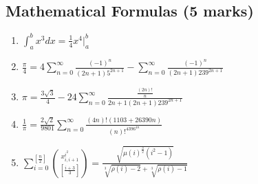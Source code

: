 \documentclass[a4paper,12pt]{article}
\begin{document}
\subsection {\textbf{Mathematical Formulas (5 marks)}}
%
\begin{enumerate}%
\item $ \int_a ^b x^3 dx = \frac{1}{4}x^4\Big\rvert_a ^b $
\item $ \frac{\pi}{4} =  4\sum\limits_{n=0}^{\infty} \frac{(-1)^n}{(2n+1)5^{2n+1}}  -  \sum\limits_{n=0}^{\infty} \frac{(-1)^n}{(2n+1)239^{2n+1}} $
\item $ \pi = \frac{3\sqrt{3}}{4} -24\sum\limits_{n=0}^{\infty} \frac{\frac{(2n)!}{n}}{2n+1(2n+1)239^{2n+1}} $
\item $\frac{1}{\pi} = \frac{2\sqrt{2}}{9801}\sum\limits_{n=0}^{\infty}\frac{(4n)!(1103 + 26390n)}{(n)!^4396^{4n}} $
\item $\sum_{i=0}^{[\frac{n}{2}]} \binom{x^{i^2}_{i,i+1}}{[\frac{i+3}{3}]} = \frac{\sqrt{\mu(i)^{\frac{3}{2}}(i^2 - 1)}}{\sqrt[3]{\rho(i)-2}+\sqrt[3]{\rho(i)-1}}$
\end{enumerate}
\pagebreak
\end{document}
